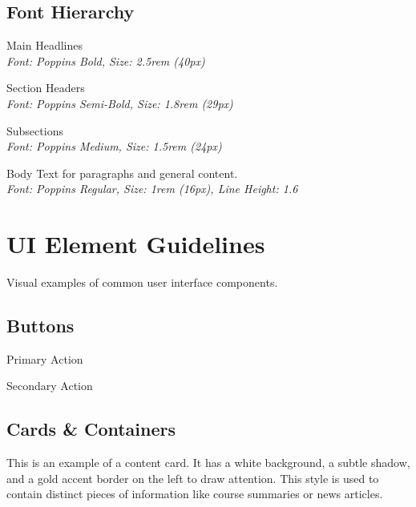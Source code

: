 \documentclass[a4paper, 11pt]{article}
\begin{document}
\subsection{Font Hierarchy}
\begin{description}[font=\normalfont\poppinsmedium, style=unboxed, leftmargin=2cm, labelwidth=1.5cm]
    \item[H1:] {\poppinsbold\Large Main Headlines} \\
    \textit{Font: Poppins Bold, Size: 2.5rem (40px)}
    \item[H2:] {\poppinssemibold\large Section Headers} \\
    \textit{Font: Poppins Semi-Bold, Size: 1.8rem (29px)}
    \item[H3:] {\poppinsmedium\normalsize Subsections} \\
    \textit{Font: Poppins Medium, Size: 1.5rem (24px)}
    \item[Body:] {\normalsize Body Text for paragraphs and general content.} \\
    \textit{Font: Poppins Regular, Size: 1rem (16px), Line Height: 1.6}
\end{description}

\section{UI Element Guidelines}
Visual examples of common user interface components.

\subsection{Buttons}
\begin{center}
    \begin{primarybutton}
        Primary Action
    \end{primarybutton}
    \vspace{5mm}
    \begin{secondarybutton}
        Secondary Action
    \end{secondarybutton}
\end{center}

\subsection{Cards \& Containers}
\begin{cardcontainer}
    This is an example of a content card. It has a white background, a subtle shadow, and a gold accent border on the left to draw attention. This style is used to contain distinct pieces of information like course summaries or news articles.
\end{cardcontainer}
\end{document}
